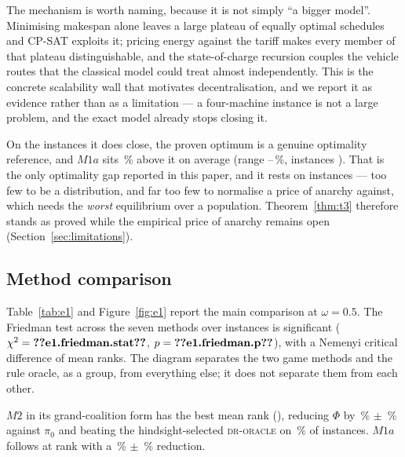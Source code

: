 \documentclass[preprint, 3p, review, 12pt]{elsarticle}
\theoremstyle{definition}
\begin{document}
The mechanism is worth naming, because it is not simply ``a bigger model''. Minimising
makespan alone leaves a large plateau of equally optimal schedules and CP-SAT exploits it;
pricing energy against the tariff makes every member of that plateau distinguishable, and the
state-of-charge recursion couples the vehicle routes that the classical model could treat
almost independently. This is the concrete scalability wall that motivates decentralisation,
and we report it as evidence rather than as a limitation --- a four-machine instance is not a
large problem, and the exact model already stops closing it.

On the instances it does close, the proven optimum is a genuine optimality reference, and
$M1a$ sits \,\% above it on average (range
--\,\%, instances ).
That is the only optimality gap reported in this paper, and it rests on
 instances --- too few to be a distribution, and far too few to
normalise a price of anarchy against, which needs the \emph{worst} equilibrium over a
population. Theorem~\ref{thm:t3} therefore stands as proved while the empirical price of
anarchy remains open (Section~\ref{sec:limitations}).

\subsection{Method comparison}
\label{sec:res-e1}
Table~\ref{tab:e1} and Figure~\ref{fig:e1} report the main comparison at $\omega=0.5$. The Friedman test across the
seven methods over  instances is significant
($\chi^2=\jnum{e1.friedman.stat}$, $p=\jnum{e1.friedman.p}$), with a Nemenyi critical
difference of  mean ranks. The diagram separates the two game methods
and the rule oracle, as a group, from everything else; it does not separate them from each
other.

$M2$ in its grand-coalition form has the best mean rank (), reducing
$\Phi$ by \,\% $\pm$ \,\% against
$\pi_0$ and beating the hindsight-selected \textsc{dr-oracle} on
\,\% of instances. $M1a$ follows at rank
 with a \,\% $\pm$ \,\%
reduction.
\end{document}

